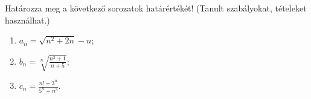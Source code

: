 \documentclass[11pt]{scrartcl}
\begin{document}
Határozza meg a következő sorozatok határértékét! (Tanult szabályokat,
tételeket használhat.)
\begin{enumerate}
	\item \(\displaystyle
	      a_n = \sqrt{n^2 + 2n} - n;
	      \)

	\item \(\displaystyle
	      b_n = \sqrt[n]{\frac{n^3 + 1}{n + 5}};
	      \)

	\item \(\displaystyle
	      c_n = \frac{n! + 3^n}{5^n + n^3}.
	      \)
\end{enumerate}
\end{document}

